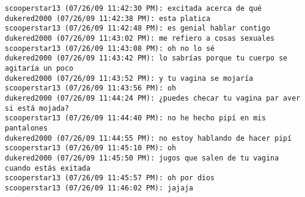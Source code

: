 \begin{verbatim}
scooperstar13 (07/26/09 11:42:30 PM): excitada acerca de qué
dukered2000 (07/26/09 11:42:38 PM): esta platica
scooperstar13 (07/26/09 11:42:48 PM): es genial hablar contigo
dukered2000 (07/26/09 11:43:02 PM): me refiero a cosas sexuales
scooperstar13 (07/26/09 11:43:08 PM): oh no lo sé
dukered2000 (07/26/09 11:43:42 PM): lo sabrías porque tu cuerpo se agitaría un poco
dukered2000 (07/26/09 11:43:52 PM): y tu vagina se mojaría
scooperstar13 (07/26/09 11:43:56 PM): oh
dukered2000 (07/26/09 11:44:24 PM): ¿puedes checar tu vagina par aver si está mojada?
scooperstar13 (07/26/09 11:44:40 PM): no he hecho pipí en mis pantalones
dukered2000 (07/26/09 11:44:55 PM): no estoy hablando de hacer pipí
scooperstar13 (07/26/09 11:45:10 PM): oh
dukered2000 (07/26/09 11:45:50 PM): jugos que salen de tu vagina cuando estás exitada
scooperstar13 (07/26/09 11:45:57 PM): oh por dios
scooperstar13 (07/26/09 11:46:02 PM): jajaja
\end{verbatim}